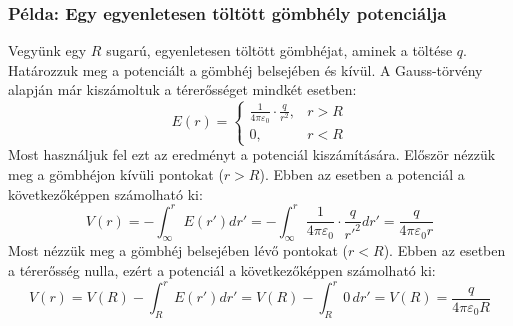 \documentclass[../main.tex]{subfiles}
\begin{document}
\subsubsection*{Példa: Egy egyenletesen töltött gömbhély potenciálja}
Vegyünk egy $R$ sugarú, egyenletesen töltött gömbhéjat, aminek a töltése $q$. Határozzuk meg a potenciált a gömbhéj belsejében és kívül.
A Gauss-törvény alapján már kiszámoltuk a térerősséget mindkét esetben:
\begin{equation}
    E(r) = \begin{cases}
        \frac{1}{4 \pi \varepsilon_0} \cdot \frac{q}{r^2}, & r > R \\
        0, & r < R
    \end{cases}
\end{equation}
Most használjuk fel ezt az eredményt a potenciál kiszámítására. Először nézzük meg a gömbhéjon kívüli pontokat ($r > R$). Ebben az esetben a potenciál a következőképpen számolható ki:
\begin{equation}
    V(r) = - \int_{\infty}^{r} E(r') dr' = - \int_{\infty}^{r} \frac{1}{4 \pi \varepsilon_0} \cdot \frac{q}{r'^2} dr' = \frac{{q}}{4 \pi \varepsilon_0 r}
\end{equation}
Most nézzük meg a gömbhéj belsejében lévő pontokat ($r < R$). Ebben az esetben a térerősség nulla, ezért a potenciál a következőképpen számolható ki:
\begin{equation}
    V(r) = V(R) - \int_{R}^{r} E(r') dr' = V(R) - \int_{R}^{r} 0 \, dr' = V(R) = \frac{q}{4 \pi \varepsilon_0 R}
\end{equation}
\end{document}
